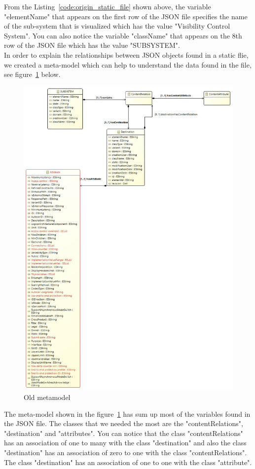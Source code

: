 From the Listing~\ref{code:origin_static_file} shown above, the variable "elementName" that appears on the first row of the JSON file specifies the name of the sub-system that is visualized which has the value "Visibility Control System". You can also notice the variable "className" that appears on the 8th row of the JSON file which has the value "SUBSYSTEM". \\

In order to explain the relationships between JSON objects found in a static flie, we created a meta-model which can help to understand the data found in the file, see figure~\ref{fig:old_metamodel} below.

\begin{figure}[H]
\centering
\captionsetup{justification=centering}
\vspace{0cm}%
\includegraphics[width=0.85\linewidth]{figure/new_model/Old_Metamodel.jpg}
\caption{Old metamodel}
\label{fig:old_metamodel}
\end{figure}

The meta-model shown in the figure~\ref{fig:old_metamodel} has sum up most of the variables found in the JSON file. The classes that we needed the most are the "contentRelations", "destination" and "attributes". You can notice that the class "contentRelations" has an association of one to many with the class "destination" and also the class "destination" has an association of zero to one with the class "contentRelations". The class "destination" has an association of one to one with the class "attribute". \\


